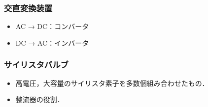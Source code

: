 \subsubsection{交直変換装置}
\begin{itemize}
  \item AC → DC：コンバータ
  \item DC → AC：インバータ
\end{itemize}

\subsubsection{サイリスタバルブ}
\begin{itemize}
  \item 高電圧，大容量のサイリスタ素子を多数個組み合わせたもの．
  \item 整流器の役割．
\end{itemize}

